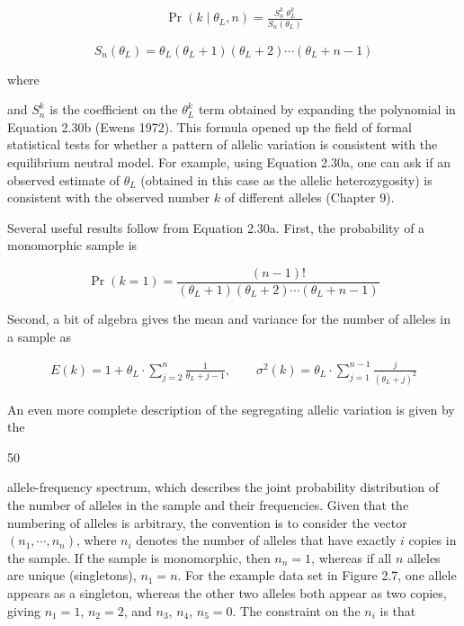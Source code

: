 \documentclass{article}
\begin{document}
\begin{equation}
\begin{align*}\Pr(k\mid\theta_L,n)=\frac{S_n^k\;\theta_L^k}{S_n(\theta_L)}\end{align*}
\tag{2.30a}
\label{eq:2_30a}
\end{equation}

\begin{equation}
S_{n}(\theta_{L})=\theta_{L}(\theta_{L}+1)(\theta_{L}+2)\cdots(\theta_{L}+n-1)
\tag{2.30b}
\label{eq:2_30b}
\end{equation}

where

and  $ S_n^k $ is the coefficient on the  $ \theta_L^k $ term obtained by expanding the polynomial in Equation 2.30b (Ewens 1972). This formula opened up the field of formal statistical tests for whether a pattern of allelic variation is consistent with the equilibrium neutral model. For example, using Equation 2.30a, one can ask if an observed estimate of  $ \theta_L $ (obtained in this case as the allelic heterozygosity) is consistent with the observed number  $ k $ of different alleles (Chapter 9).

Several useful results follow from Equation 2.30a. First, the probability of a monomorphic sample is

\begin{equation}
\Pr(k=1)=\frac{(n-1)!}{(\theta_{L}+1)(\theta_{L}+2)\cdots(\theta_{L}+n-1)}
\tag{2.31a}
\label{eq:2_31a}
\end{equation}

Second, a bit of algebra gives the mean and variance for the number of alleles in a sample as

\begin{equation}
\begin{align*}E(k)=1+\theta_L\cdot\sum\limits_{j=2}^n\frac{1}{\theta_L+j-1},\qquad\sigma^2(k)=\theta_L\cdot\sum\limits_{j=1}^{n-1}\frac{j}{(\theta_L+j)^2}\end{align*}
\tag{2.31b}
\label{eq:2_31b}
\end{equation}

An even more complete description of the segregating allelic variation is given by the

50

allele-frequency spectrum, which describes the joint probability distribution of the number of alleles in the sample and their frequencies. Given that the numbering of alleles is arbitrary, the convention is to consider the vector  $ (n_1, \cdots, n_n) $, where  $ n_i $ denotes the number of alleles that have exactly  $ i $ copies in the sample. If the sample is monomorphic, then  $ n_n = 1 $, whereas if all  $ n $ alleles are unique (singletons),  $ n_1 = n $. For the example data set in Figure 2.7, one allele appears as a singleton, whereas the other two alleles both appear as two copies, giving  $ n_1 = 1 $,  $ n_2 = 2 $, and  $ n_3 $,  $ n_4 $,  $ n_5 = 0 $. The constraint on the  $ n_i $ is that
\end{document}
